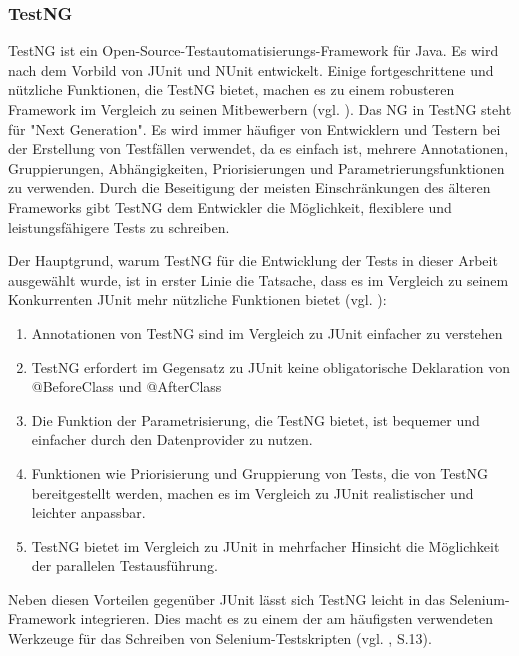 \subsubsection{TestNG}

TestNG ist ein Open-Source-Testautomatisierungs-Framework für Java. Es wird
nach dem Vorbild von JUnit und NUnit entwickelt. Einige fortgeschrittene und
nützliche Funktionen, die TestNG bietet, machen es zu einem robusteren
Framework im Vergleich zu seinen Mitbewerbern (vgl. \cite{browserstack}).
Das NG in TestNG steht für "Next Generation". Es wird immer häufiger von
Entwicklern und Testern bei der Erstellung von Testfällen verwendet, da es
einfach ist, mehrere Annotationen, Gruppierungen, Abhängigkeiten,
Priorisierungen und Parametrierungsfunktionen zu verwenden. Durch die
Beseitigung der meisten Einschränkungen des älteren Frameworks gibt TestNG
dem Entwickler die Möglichkeit, flexiblere und leistungsfähigere Tests zu
schreiben.

Der Hauptgrund, warum TestNG für die Entwicklung der Tests in dieser
Arbeit ausgewählt wurde, ist in erster Linie die Tatsache, dass es im
Vergleich zu seinem Konkurrenten JUnit mehr nützliche Funktionen
bietet (vgl. \cite{browserstack}):

\begin{enumerate}
    \item Annotationen von TestNG sind im Vergleich zu JUnit
    einfacher zu verstehen
    \item TestNG erfordert im Gegensatz zu JUnit keine
    obligatorische Deklaration von @BeforeClass und @AfterClass
    \item Die Funktion der Parametrisierung, die TestNG bietet, ist
    bequemer und einfacher durch den Datenprovider zu nutzen.
    \item Funktionen wie Priorisierung und Gruppierung von Tests,
    die von TestNG bereitgestellt werden, machen es im Vergleich zu
    JUnit realistischer und leichter anpassbar.
    \item TestNG bietet im Vergleich zu JUnit in mehrfacher
    Hinsicht die Möglichkeit der parallelen Testausführung.

\end{enumerate}

Neben diesen Vorteilen gegenüber JUnit lässt sich TestNG leicht in das
Selenium-Framework integrieren. Dies macht es zu einem der am häufigsten
verwendeten Werkzeuge für das Schreiben von Selenium-Testskripten
(vgl. \cite{selenium-survey}, S.13).
